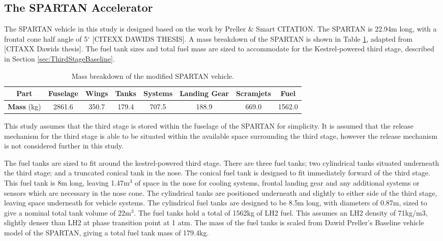 	
		\subsection{The SPARTAN Accelerator}
		
		The SPARTAN vehicle in this study is designed based on the work by Preller \& Smart CITATION. The SPARTAN is 22.94m long, with a frontal cone half angle of 5$^\circ$ [CITEXX DAWIDS THESIS]. A mass breakdown of the SPARTAN is shown in Table \ref{tab:MassBreakdown}, adapted from [CITAXX Dawids thesis]. The fuel tank sizes and total fuel mass are sized to accommodate for the Kestrel-powered third stage, described in Section \ref{sec:ThirdStageBaseline}.
		\begin{table}[h]
		\begin{tabular}{|c|c|c|c|c|c|c|c|}
			\hline  \textbf{Part} & Fuselage & Wings & Tanks & Systems & Landing Gear & Scramjets & Fuel \\ 
			\hline \textbf{Mass} (kg) & 2861.6 & 350.7 & 179.4 & 707.5 & 188.9 & 669.0 & 1562.0 \\ 
			\hline 
		\end{tabular} 
		\caption{Mass breakdown of the modified SPARTAN vehicle.}
		\label{tab:MassBreakdown}
		\end{table}
This study assumes that the third stage is stored within the fuselage of the SPARTAN for simplicity. It is assumed that the release mechanism for the third stage is able to be situated within the available space surrounding the third stage, however the release mechanism is not considered further in this study. 
		
		

		The fuel tanks are sized to fit around the kestrel-powered third stage. There are three fuel tanks; two cylindrical tanks situated underneath the third stage; and a truncated conical tank in the nose. The conical fuel tank is designed to fit immediately forward of the third stage. This fuel tank is 8m long, leaving 1.47m$^3$ of space in the nose for cooling systems, frontal landing gear and any additional systems or sensors which are necessary in the nose cone. The cylindrical tanks are positioned underneath and slightly to either side of the third stage, leaving space underneath for vehicle systems. The cylindrical fuel tanks are designed to be 8.5m long, with diameters of 0.87m, sized to give a nominal total tank volume of 22m$^3$.
The fuel tanks hold a total of 1562kg of LH2 fuel. This assumes an LH2 density of 71kg/m3, slightly denser than LH2 at phase transition point at 1 atm.
The mass of the fuel tanks is scaled from Dawid Preller's Baseline vehicle model of the SPARTAN, giving a total fuel tank mass of 179.4kg.
		
